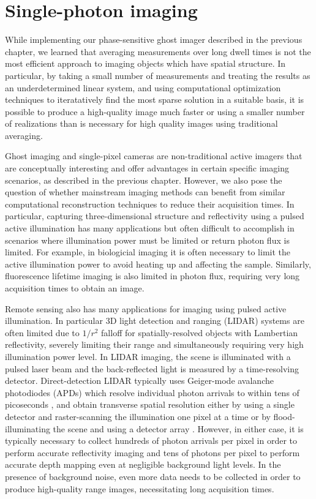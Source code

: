 \chapter{Single-photon imaging}

While implementing our phase-sensitive ghost imager described in the previous chapter, we learned that averaging measurements over long dwell times is not the most efficient approach to imaging objects which have spatial structure. In particular, by taking a small number of measurements and treating the results as an underdetermined linear system, and using computational optimization techniques to iteratatively find the most sparse solution in a suitable basis, it is possible to produce a high-quality image much faster or using a smaller number of realizations than is necessary for high quality images using traditional averaging.

Ghost imaging and single-pixel cameras are non-traditional active imagers that are conceptually interesting and offer advantages in certain specific imaging scenarios, as described in the previous chapter. However, we also pose the question of whether mainstream imaging methods can benefit from similar computational reconstruction techniques to reduce their acquisition times. In particular, capturing three-dimensional structure and reflectivity using a pulsed active illumination has many applications \cite{nicolas-applications} but often difficult to accomplish in scenarios where illumination power must be limited or return photon flux is limited. For example, in biologicial imaging it is often necessary to limit the active illumination power to avoid heating up and affecting the sample. Similarly, fluorescence lifetime imaging \cite{becker-fluorescence} is also limited in photon flux, requiring very long acquisition times to obtain an image.

Remote sensing also has many applications for imaging using pulsed active illumination. In particular 3D light detection and ranging (LIDAR) systems are often limited due to $1/r^2$ falloff for spatially-resolved objects with Lambertian reflectivity, severely limiting their range and simultaneously requiring very high illumination power level. In LIDAR imaging, the scene is illuminated with a pulsed laser beam and the back-reflected light is measured by a time-resolving detector. Direct-detection LIDAR typically uses Geiger-mode avalanche photodiodes (APDs) which resolve individual photon arrivals to within tens of picoseconds \cite{savage-single}, and obtain transverse spatial resolution either by using a single detector and raster-scanning the illumination one pixel at a time \cite{buller-ranging} or by flood-illuminating the scene and using a detector array \cite{jack-hgcdte}. However, in either case, it is typically necessary to collect hundreds of photon arrivals per pixel in order to perform accurate reflectivity imaging and tens of photons per pixel to perform accurate depth mapping \cite{albota-three,degnan-photon,snyder-random,obrien-simulation,mccarthy-kilometer,pellegrini-laser} even at negligible background light levels. In the presence of background noise, even more data needs to be collected in order to produce high-quality range images, necessitating long acquisition times.

